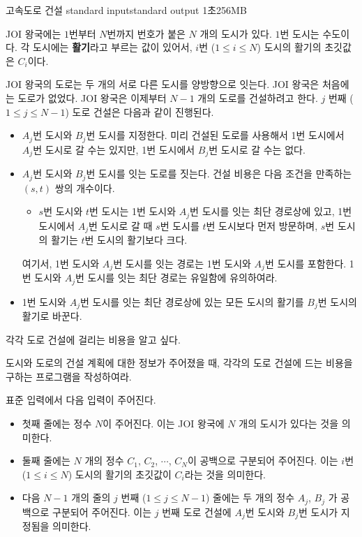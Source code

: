\begin{problem}{고속도로 건설}
	{standard input}{standard output}
	{1초}{256MB}{}
	
	
	JOI 왕국에는 $1$번부터 $N$번까지 번호가 붙은 $N$ 개의 도시가 있다. $1$번 도시는 수도이다. 각 도시에는 \textbf{활기}라고 부르는 값이 있어서, $i$번 ($1 \le i \le N$) 도시의 활기의 초깃값은 $C_i$이다.
	
	JOI 왕국의 도로는 두 개의 서로 다른 도시를 양방향으로 잇는다. JOI 왕국은 처음에는 도로가 없었다. JOI 왕국은 이제부터 $N-1$ 개의 도로를 건설하려고 한다. $j$ 번째 ($1 \le j \le N-1$) 도로 건설은 다음과 같이 진행된다.
	
	\begin{itemize}
		\item $A_j$번 도시와 $B_j$번 도시를 지정한다. 미리 건설된 도로를 사용해서 1번 도시에서 $A_j$번 도시로 갈 수는 있지만, 1번 도시에서 $B_j$번 도시로 갈 수는 없다.
		
		\item $A_j$번 도시와 $B_j$번 도시를 잇는 도로를 짓는다. 건설 비용은 다음 조건을 만족하는 $(s, t)$ 쌍의 개수이다.
		
		\begin{itemize}
			\item[] $s$번 도시와 $t$번 도시는 1번 도시와 $A_j$번 도시를 잇는 최단 경로상에 있고, 1번 도시에서 $A_j$번 도시로 갈 때 $s$번 도시를 $t$번 도시보다 먼저 방문하며, $s$번 도시의 활기는 $t$번 도시의 활기보다 크다.
		\end{itemize}
	
		여기서, 1번 도시와 $A_j$번 도시를 잇는 경로는 1번 도시와 $A_j$번 도시를 포함한다. 1번 도시와 $A_j$번 도시를 잇는 최단 경로는 유일함에 유의하여라.
		
		\item 1번 도시와 $A_j$번 도시를 잇는 최단 경로상에 있는 모든 도시의 활기를 $B_j$번 도시의 활기로 바꾼다.		 
	\end{itemize}
	
	각각 도로 건설에 걸리는 비용을 알고 싶다.
	
	도시와 도로의 건설 계획에 대한 정보가 주어졌을 때, 각각의 도로 건설에 드는 비용을 구하는 프로그램을 작성하여라.
	
	
	\InputFile
	
	표준 입력에서 다음 입력이 주어진다.
	
	\begin{itemize}
		\item 첫째 줄에는 정수 $N$이 주어진다. 이는 JOI 왕국에 $N$ 개의 도시가 있다는 것을 의미한다.
		\item 둘째 줄에는 $N$ 개의 정수 $C_1$, $C_2$, $\cdots$, $C_N$이 공백으로 구분되어 주어진다. 이는 $i$번 ($1 \le i \le N$) 도시의 활기의 초깃값이 $C_i$라는 것을 의미한다.
		\item 다음 $N-1$ 개의 줄의 $j$ 번째 ($1 \le j \le N-1$) 줄에는 두 개의 정수 $A_j$, $B_j$ 가 공백으로 구분되어 주어진다. 이는 $j$ 번째 도로 건설에 $A_j$번 도시와 $B_j$번 도시가 지정됨을 의미한다.
	\end{itemize}
		

\end{problem}
